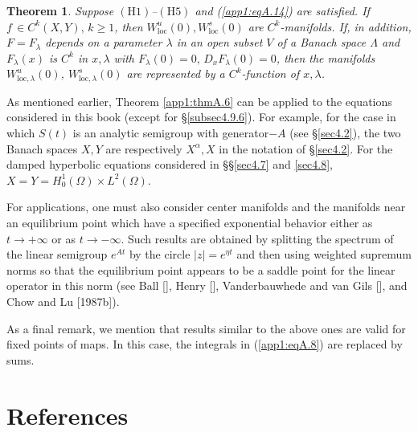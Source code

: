 \documentclass{surv-l}
\theoremstyle{plain}
\newtheorem{theorem}{Theorem}[section]
\theoremstyle{definition}
\numberwithin{equation}{section}
\numberwithin{figure}{chapter}
\begin{document}
\begin{theorem}\label{app1:thmA.7}
Suppose $(\mathrm{H}1)$--$(\mathrm{H}5)$ and \emph{(\ref{app1:eqA.14})} are satisfied. If $f\,\in C^{k}(X, Y),\,k\geq 1$, then $W_{\mathrm{loc}}^{u}(0),W_{\mathrm{loc}}^{s}(0)$ are $C^{k}$-manifolds. If, in addition, $F= F_{\lambda}$ depends on a parameter $\lambda$ in an open subset $V$ of a Banach space $\Lambda$ and $F_{\lambda}(x)$ is $C^{k}$ in $x, \lambda$ with $F_{\lambda}(0)=0,\,D_{x}F_{\lambda}(0)=0$, then the manifolds $W_{\mathrm{loc},\lambda}^{u}(0)$, $W_{\mathrm{loc},\lambda}^{s}(0)$ are represented by a $C^{k}$-function of $x,\lambda$.
\end{theorem}
As mentioned earlier, Theorem \ref{app1:thmA.6} can be applied to the equations considered in this book (except for \S\ref{subsec4.9.6}). For example, for the case in which $S(t)$ is an analytic semigroup with generator$-A$ (see \S\ref{sec4.2}), the two Banach spaces $X,Y$ are respectively $X^{\alpha},X$ in the notation of \S\ref{sec4.2}. For the damped hyperbolic equations considered in \S\S\ref{sec4.7} and \ref{sec4.8}, $X=Y=H_{0}^{1}(\Omega)\times L^{2}(\Omega)$.

For applications, one must also consider center manifolds and the manifolds near an equilibrium point which have a specified exponential behavior either as $t\rightarrow+\infty$ or as $t\rightarrow-\infty$. Such results are obtained by splitting the spectrum of the linear semigroup $e^{At}$ by the circle $|z|=e^{\eta t}$ and then using weighted supremum norms so that the equilibrium point appears to be a saddle point for the linear operator in this norm (see Ball [\citeyear{1973ba}], Henry [\citeyear{1983h}], Vanderbauwhede and van Gils [\citeyear{1987vv}], and Chow and Lu [1987b]).

As a final remark, we mention that results similar to the above ones are valid for fixed points of maps. In this case, the integrals in (\ref{app1:eqA.8}) are replaced by sums.

\def\refname{References}
\chapter*{References}
\end{document}
